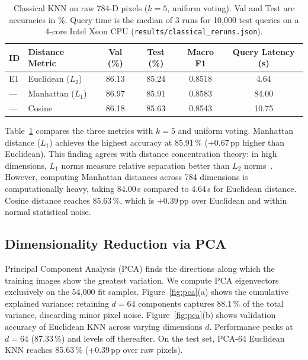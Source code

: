 \documentclass[10pt,a4paper]{article}
\newcommand{\file}[1]{\nolinkurl{#1}}
\begin{document}
\begin{table}[!htb]
\centering\footnotesize
\caption{Classical KNN on raw 784-D pixels ($k=5$, uniform voting). Val and Test are accuracies in \%. Query time is the median of 3 runs for 10{,}000 test queries on a 4-core Intel Xeon CPU (\file{results/classical_reruns.json}).}
\label{tab:metrics}
\begin{tabular}{llcccc}
\toprule
ID & Distance Metric & Val (\%) & Test (\%) & Macro F1 & Query Latency (s) \\
\midrule
E1 & Euclidean ($L_2$) & 86.13 & 85.24 & 0.8518 & 4.64 \\
--- & Manhattan ($L_1$) & 86.97 & 85.91 & 0.8583 & 84.00 \\
--- & Cosine            & 86.18 & 85.63 & 0.8543 & 10.75 \\
\bottomrule
\end{tabular}
\end{table}

Table~\ref{tab:metrics} compares the three metrics with $k=5$ and uniform voting. Manhattan distance ($L_1$) achieves the highest accuracy at 85.91\,\% (+0.67\,pp higher than Euclidean). This finding agrees with distance concentration theory: in high dimensions, $L_1$ norms measure relative separation better than $L_2$ norms~\cite{beyer1999}. However, computing Manhattan distances across 784 dimensions is computationally heavy, taking 84.00\,s compared to 4.64\,s for Euclidean distance. Cosine distance reaches 85.63\,\%, which is +0.39\,pp over Euclidean and within normal statistical noise.

\subsection{Dimensionality Reduction via PCA}\label{sec:pca}
Principal Component Analysis (PCA) finds the directions along which the training images show the greatest variation. We compute PCA eigenvectors exclusively on the 54{,}000 fit samples. Figure~\ref{fig:pca}(a) shows the cumulative explained variance: retaining $d=64$ components captures 88.1\,\% of the total variance, discarding minor pixel noise. Figure~\ref{fig:pca}(b) shows validation accuracy of Euclidean KNN across varying dimensions $d$. Performance peaks at $d=64$ (87.33\,\%) and levels off thereafter. On the test set, PCA-64 Euclidean KNN reaches 85.63\,\% (+0.39\,pp over raw pixels).
\end{document}
